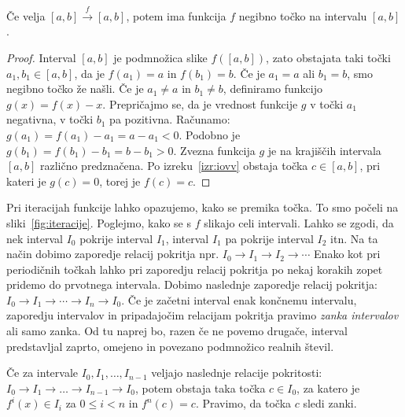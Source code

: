 \documentclass[../TG_magistrsko_delo_sections.tex]{subfiles}
\begin{document}
\begin{lema}\label{lem:1zanka}
Če velja $[a, b] \xrightarrow{f} [a, b]$, potem ima funkcija $f$ negibno točko na intervalu $[a, b]$.
\end{lema}
\begin{proof}
Interval $[a, b]$ je podmnožica slike $f([a, b])$, zato obstajata taki točki $a_1, b_1 \in [a, b]$, da je $f(a_1)=a$ in $f(b_1)=b$. Če je $a_1 = a$ ali $b_1 = b$, smo negibno točko že našli. Če je $a_1 \neq a$ in $b_1 \neq b$, definiramo funkcijo $g(x) = f(x) - x$. Prepričajmo se, da je vrednost funkcije $g$ v točki $a_1$ negativna, v točki $b_1$ pa pozitivna. Računamo:
$g(a_1) = f(a_1) - a_1 = a - a_1 < 0$. Podobno je
$g(b_1) = f(b_1) - b_1 = b - b_1 > 0$.
Zvezna funkcija $g$ je na krajiščih intervala $[a, b]$ različno predznačena. Po izreku~\ref{izr:iovv} obstaja točka $c \in [a, b]$, pri kateri je $g(c)=0$, torej je $f(c) = c$.
\end{proof}
Pri iteracijah funkcije lahko opazujemo, kako se premika točka. To smo počeli na sliki~\ref{fig:iteracije}. Poglejmo, kako se s $f$ slikajo celi intervali. Lahko se zgodi, da nek interval $I_0$ pokrije interval $I_1$, interval $I_1$ pa pokrije interval $I_2$ itn. Na ta način dobimo zaporedje relacij pokritja npr. $I_0 \to I_1 \to I_2 \to \cdots $ Enako kot pri periodičnih točkah lahko pri zaporedju relacij pokritja po nekaj korakih zopet pridemo do prvotnega intervala. Dobimo naslednje zaporedje relacij pokritja: $I_0 \to I_1 \to \cdots \to I_n \to I_0$. Če je začetni interval enak končnemu intervalu, zaporedju intervalov in pripadajočim relacijam pokritja pravimo \emph{zanka intervalov} ali samo zanka. Od tu naprej bo, razen če ne povemo drugače, interval predstavljal zaprto, omejeno in povezano podmnožico realnih števil.

\begin{lema}\label{lem:zanka}
Če za intervale $I_0, I_1, \dots, I_{n-1}$ veljajo naslednje relacije pokritosti: $I_0 \to I_1 \to \dots \to I_{n-1} \to I_0$, potem obstaja taka točka $c \in I_0$, za katero je $f^{i}(x) \in I_i$ za $0 \leq i < n$ in $f^n(c)=c$. Pravimo, da točka $c$ sledi zanki.
\end{lema}
\end{document}
